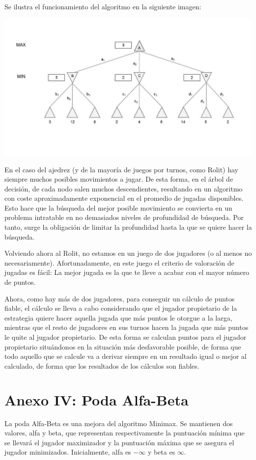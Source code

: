 \documentclass[12pt,a4paper,openright]{book}
\theoremstyle{break}
\begin{document}
Se ilustra el funcionamiento del algoritmo en la siguiente imagen: 

\begin{center}
\centering
\includegraphics[scale=0.5]{minimaxExample.jpg}
\end{center}

En el caso del ajedrez (y de la mayoría de juegos por turnos, como Rolit) hay siempre muchos posibles movimientos a jugar. De esta forma, en el árbol de decisión, de cada nodo salen muchos descendientes, resultando en un algoritmo con coste aproximadamente exponencial en el promedio de jugadas disponibles. Esto hace que la búsqueda del mejor posible movimiento se convierta en un problema intratable en no demasiados niveles de profundidad de búsqueda. Por tanto, surge la obligación de limitar la profundidad hasta la que se quiere hacer la búsqueda.

Volviendo ahora al Rolit, no estamos en un juego de dos jugadores (o al menos no necesariamente). Afortunadamente, en este juego el criterio de valoración de jugadas es fácil: La mejor jugada es la que te lleve a acabar con el mayor número de puntos.

Ahora, como hay más de dos jugadores, para conseguir un cálculo de puntos fiable, el cálculo se lleva a cabo considerando que el jugador propietario de la estrategia quiere hacer aquella jugada que más puntos le otorgue a la larga, mientras que el resto de jugadores en sus turnos hacen la jugada que más puntos le quite al jugador propietario. De esta forma se calculan puntos para el jugador propietario situándonos en la situación más desfavorable posible, de forma que todo aquello que se calcule va a derivar siempre en un resultado igual o mejor al calculado, de forma que los resultados de los cálculos son fiables.

\chapter{Anexo IV: Poda Alfa-Beta}
\label{ch:AnexoIV}
La poda Alfa-Beta es una mejora del algoritmo Minimax. Se mantienen dos valores, alfa y beta, que representan respectivamente la puntuación mínima que se llevará el jugador maximizador y la puntuación máxima que se asegura el jugador minimizados. Inicialmente, alfa es $-\infty$ y beta es $\infty$. 
\end{document}
